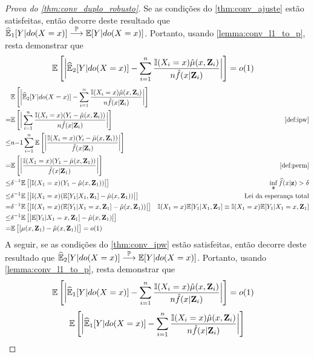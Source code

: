 \begin{proof}[Prova do \cref{thm:conv_duplo_robusto}]
 Se as condições do \cref{thm:conv_ajuste} estão satisfeitas,
 então decorre deste resultado que 
 ${\widehat{{\mathbb E}}}_{1}[Y|do(X=x)] \stackrel{{\mathbb P}}{\longrightarrow} {\mathbb E}[Y|do(X=x)]$. Portanto, 
 usando \cref{lemma:conv_l1_to_p}, 
 resta demonstrar que
 \begin{align*}
  {\mathbb E}\left[\bigg|{\widehat{{\mathbb E}}}_{2}[Y|do(X=x)] 
  -\sum_{i=1}^n \frac{{\mathbb I}(X_i=x)\hat{\mu}(x,{\mathbf{Z}}_i)}
  {n\hat{f}(x|{\mathbf{Z}}_i)}\bigg|\right]
  &= o(1)
 \end{align*}
 \begin{align*}
  &\E\left[\bigg|\hdoyb 
  -\sum_{i=1}^n \frac{\I(X_i=x)\hat{\mu}(x,\Z_i)}
  {n\hat{f}(x|\Z_i)}\bigg|\right] \\
  =& \E\left[\bigg|\sum_{i=1}^n \frac{\I(X_i=x)(Y_i-\hat{\mu}(x,\Z_i))}
  {n\hat{f}(x|\Z_i)}\bigg|\right]
  & \text{\cref{def:ipw}} \\
  \leq& n{-1}\sum_{i=1}^n
  \E\left[\bigg|\frac{\I(X_i=x)(Y_i-\hat{\mu}(x,\Z_i))}
  {\hat{f}(x|\Z_i)}\bigg|\right] \\
  =& \E\left[\bigg|\frac{\I(X_1=x)(Y_1-\hat{\mu}(x,\Z_1))}
  {\hat{f}(x|\Z_1)}\bigg|\right]
  & \text{\cref{def:perm}} \\
  \leq& \delta^{-1}
  \E\left[\big|\I(X_1=x)(Y_1-\hat{\mu}(x,\Z_1))
  \big|\right]
  & \inf_\z \hf(x|\z) > \delta \\
  \leq& \delta^{-1}
  \E\left[\big|\I(X_1=x)(\E[Y_1|X_1,\Z_1]-\hat{\mu}(x,\Z_1))
  \big|\right]
  & \text{Lei da esperança total} \\
  =& \delta^{-1}
  \E\left[\big|\I(X_1=x)(\E[Y_1|X_1=x,\Z_1]-\hat{\mu}(x,\Z_1))
  \big|\right]
  & \I(X_1=x)\E[Y_1|X_1,\Z_1] 
  \equiv \I(X_1=x)\E[Y_1|X_1=x,\Z_1] \\
  \leq&\delta^{-1}
  \E\left[\big|\E[Y_1|X_1=x,\Z_1]-\hat{\mu}(x,\Z_1)
  \big|\right] \\
  =& \E\left[\big|\mu(x,\Z_1)-\hat{\mu}(x,\Z_1)
  \big|\right] = o(1)
 \end{align*}
 A seguir, se as condições do 
 \cref{thm:conv_ipw} estão satisfeitas,
 então decorre deste resultado que 
 ${\widehat{{\mathbb E}}}_{2}[Y|do(X=x)] \stackrel{{\mathbb P}}{\longrightarrow} {\mathbb E}[Y|do(X=x)]$.
 Portanto, 
 usando \cref{lemma:conv_l1_to_p}, 
 resta demonstrar que
 \begin{align*}
  {\mathbb E}\left[\bigg|{\widehat{{\mathbb E}}}_{1}[Y|do(X=x)] 
  -\sum_{i=1}^n \frac{{\mathbb I}(X_i=x)\hat{\mu}(x,{\mathbf{Z}}_i)}
  {n\hat{f}(x|{\mathbf{Z}}_i)}\bigg|\right]
  &= o(1)
 \end{align*}
 \begin{align*}
  &\E\left[\bigg|\hdoy 
  -\sum_{i=1}^n \frac{\I(X_i=x)\hat{\mu}(x,\Z_i)}
  {n\hat{f}(x|\Z_i)}\bigg|\right] \\

\end{align*}
\end{proof}
